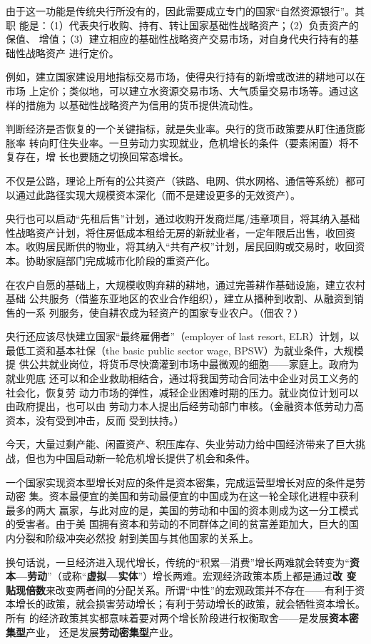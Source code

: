 由于这一功能是传统央行所没有的，因此需要成立专门的国家“自然资源银行”。其职
能是：（1）代表央行收购、持有、转让国家基础性战略资产；（2）负责资产的保值、
增值；（3）建立相应的基础性战略资产交易市场，对自身代央行持有的基础性战略资产
进行定价。

例如，建立国家建设用地指标交易市场，使得央行持有的新增或改进的耕地可以在市场
上定价；类似地，可以建立水资源交易市场、大气质量交易市场等。通过这样的措施为
以基础性战略资产为信用的货币提供流动性。

判断经济是否恢复的一个关键指标，就是失业率。央行的货币政策要从盯住通货膨胀率
转向盯住失业率。一旦劳动力实现就业，危机增长的条件（要素闲置）将不复存在，增
长也要随之切换回常态增长。

不仅是公路，理论上所有的公共资产（铁路、电网、供水网格、通信等系统）都可以通过此路径实现大规模资本深化（而不是建设更多的无效资产）。

央行也可以启动“先租后售”计划，通过收购开发商烂尾/违章项目，将其纳入基础性战略资产计划，将住房低成本租给无房的新就业者，一定年限后出售，收回资本。收购居民断供的物业，将其纳入“共有产权”计划，居民回购或交易时，收回资本。协助家庭部门完成城市化阶段的重资产化。


在农户自愿的基础上，大规模收购弃耕的耕地，通过完善耕作基础设施，建立农村基础
公共服务（借鉴东亚地区的农业合作组织），建立从播种到收割、从融资到销售的一系
列服务，使自耕农成为轻资产的国家专业农户。（佃农？）


央行还应该尽快建立国家“最终雇佣者”（employer of last resort, ELR）计划，以
最低工资和基本社保（the basic public sector wage, BPSW）为就业条件，大规模提
供公共就业岗位，将货币尽快滴灌到市场中最微观的细胞——家庭上。政府为就业兜底
还可以和企业救助相结合，通过将我国劳动合同法中企业对员工义务的社会化，恢复劳
动力市场的弹性，减轻企业困难时期的压力。就业岗位计划可以由政府提出，也可以由
劳动力本人提出后经劳动部门审核。（金融资本低劳动力高资本，没有受到冲击，反而
受到扶持。）

今天，大量过剩产能、闲置资产、积压库存、失业劳动力给中国经济带来了巨大挑战，但也为中国启动新一轮危机增长提供了机会和条件。

一个国家实现资本型增长对应的条件是资本密集，完成运营型增长对应的条件是劳动密
集。资本最便宜的美国和劳动最便宜的中国成为在这一轮全球化进程中获利最多的两大
赢家，与此对应的是，美国的劳动和中国的资本则成为这一分工模式的受害者。由于美
国拥有资本和劳动的不同群体之间的贫富差距加大，巨大的国内分裂和阶级冲突必然投
射到美国与其他国家的关系上。

换句话说，一旦经济进入现代增长，传统的“积累—消费”增长两难就会转变为“\textbf{资
  本—劳动}”（或称“\textbf{虚拟—实体}”）增长两难。宏观经济政策本质上都是通过\textbf{改
变贴现倍数}来改变两者间的分配关系。所谓“中性”的宏观政策并不存在——有利于资
本增长的政策，就会损害劳动增长；有利于劳动增长的政策，就会牺牲资本增长。所有
的经济政策其实都意味着要对两个增长阶段进行权衡取舍——是发展\textbf{资本密集型}产业，
还是发展\textbf{劳动密集型}产业。


